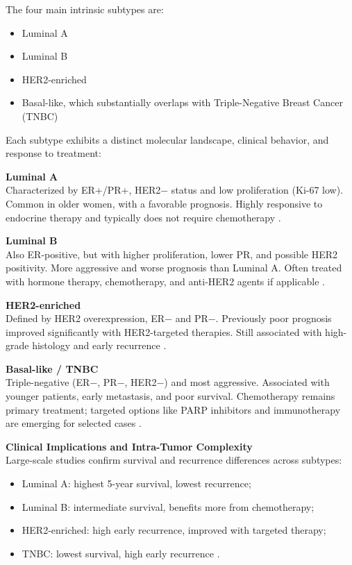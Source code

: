 The four main intrinsic subtypes are:
\begin{itemize}
  \item Luminal A
  \item Luminal B
  \item HER2-enriched
  \item Basal-like, which substantially overlaps with Triple-Negative Breast Cancer
        (TNBC)
\end{itemize}

Each subtype exhibits a distinct molecular landscape, clinical behavior, and
response to treatment:

\textbf{Luminal A} \\
Characterized by ER+/PR+, HER2− status and low proliferation (Ki-67 low). Common in older women, with a favorable prognosis. Highly responsive to endocrine therapy and typically does not require chemotherapy \textcite{clinical_implication_bca_Adamo2015,diff_bca_usa_Howlader2018}.

\textbf{Luminal B} \\
Also ER-positive, but with higher proliferation, lower PR, and possible HER2 positivity. More aggressive and worse prognosis than Luminal A. Often treated with hormone therapy, chemotherapy, and anti-HER2 agents if applicable \textcite{bc_subtypes_Prat2015Clinical,updatedbca_Hong2022Breast}.

\textbf{HER2-enriched} \\
Defined by HER2 overexpression, ER− and PR−. Previously poor prognosis improved significantly with HER2-targeted therapies. Still associated with high-grade histology and early recurrence \textcite{clinical_implication_bca_Adamo2015,bc_subtypes_Prat2015Clinical}.

\textbf{Basal-like / TNBC} \\
Triple-negative (ER−, PR−, HER2−) and most aggressive. Associated with younger patients, early metastasis, and poor survival. Chemotherapy remains primary treatment; targeted options like PARP inhibitors and immunotherapy are emerging for selected cases \textcite{tnbc_therapies_Mahalingam2020The}.

\textbf{Clinical Implications and Intra-Tumor Complexity} \\
Large-scale studies confirm survival and recurrence differences across subtypes:
\begin{itemize}
  \item Luminal A: highest 5-year survival, lowest recurrence;
  \item Luminal B: intermediate survival, benefits more from chemotherapy;
  \item HER2-enriched: high early recurrence, improved with targeted therapy;
  \item TNBC: lowest survival, high early recurrence
        \textcite{diff_bca_usa_Howlader2018,bc_subtypes_Prat2015Clinical}.
\end{itemize}

